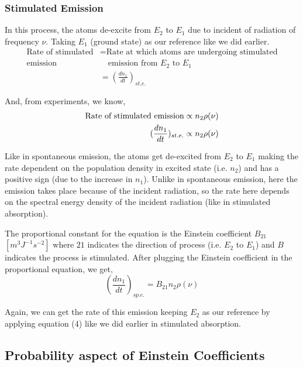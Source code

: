 \documentclass[12pt]{article}
\begin{document}
\subsubsection{Stimulated Emission}

In this process, the atoms de-excite from $E_{2}$ to $E_{1}$ due to incident of radiation of frequency $\nu$. Taking $E_{1}$ (ground state) as our reference like we did earlier.
\begin{align*}
    \text{Rate of stimulated} & = \text{Rate at which atoms are undergoing stimulated} \\
    \text{emission} & \quad \text{emission from } E_{2} \text{ to } E_{1} \\ 
    & = (\frac{dn_{1}}{dt})_{st.e.}
\end{align*}

And, from experiments, we know, 
\begin{align*}
    \textnormal{Rate of stimulated emission} \propto n_{2}\rho(\nu) \\ 
    (\frac{dn_{1}}{dt})_{st.e.} \propto n_{2}\rho(\nu)
\end{align*}

Like in spontaneous emission, the atoms get de-excited from $E_{2}$ to $E_{1}$ making the rate dependent on the population density in excited state (i.e. $n_{2}$) and has a positive sign (due to the increase in $n_{1}$). Unlike in spontaneous emission, here the emission takes place because of the incident radiation, so the rate here depends on the spectral energy density of the incident radiation (like in stimulated absorption). \vspace{.2cm}

The proportional constant for the equation is the Einstein coefficient $B_{21}$ $[m^{3}J^{-1}s^{-2}]$ where $21$ indicates the direction of process (i.e. $E_{2}$ to $E_{1}$) and $B$ indicates the process is stimulated. After plugging the Einstein coefficient in the proportional equation, we get,
\begin{equation}
    (\frac{dn_{1}}{dt})_{sp.e.} = B_{21}n_{2}\rho(\nu)
\end{equation}

Again, we can get the rate of this emission keeping $E_{2}$ as our reference by applying equation (4) like we did earlier in stimulated absorption.

\subsection{Probability aspect of Einstein Coefficients}
\end{document}
